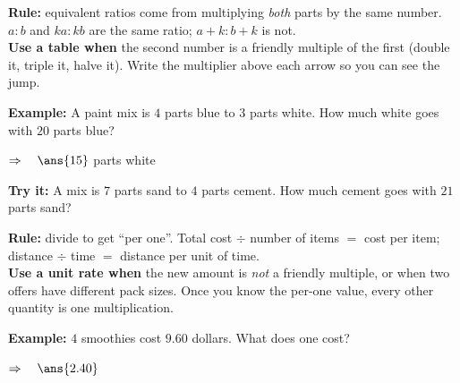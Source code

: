 \documentclass[12pt]{article}
\begin{document}


\begin{formulabox}
\textbf{Rule:} equivalent ratios come from multiplying \emph{both} parts by
the same number. $a : b$ and $ka : kb$ are the same ratio; $a + k : b + k$ is
not.\\[3pt]
\textbf{Use a table when} the second number is a friendly multiple of the
first (double it, triple it, halve it). Write the multiplier above each arrow
so you can see the jump.
\end{formulabox}

\begin{examplebox}
\textbf{Example:} A paint mix is $4$ parts blue to $3$ parts white. How much
white goes with $20$ parts blue?

$\Rightarrow\quad \ans{15}$ parts white
\end{examplebox}

\begin{tryitbox}
\textbf{Try it:} A mix is $7$ parts sand to $4$ parts cement. How much cement
goes with $21$ parts sand?\\[2pt]
\end{tryitbox}


\begin{formulabox}
\textbf{Rule:} divide to get ``per one''. Total cost $\div$ number of items
$=$ cost per item; distance $\div$ time $=$ distance per unit of time.\\[3pt]
\textbf{Use a unit rate when} the new amount is \emph{not} a friendly multiple,
or when two offers have different pack sizes. Once you know the per-one value,
every other quantity is one multiplication.
\end{formulabox}

\begin{examplebox}
\textbf{Example:} $4$ smoothies cost $9.60$ dollars. What does one cost?

$\Rightarrow\quad \ans{2.40}$
\end{examplebox}
\end{document}
